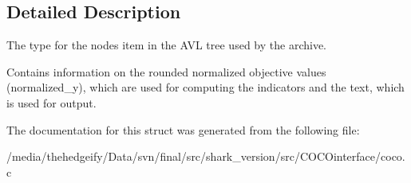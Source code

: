 \subsection{Detailed Description}
The type for the node\textquotesingle{}s item in the A\+VL tree used by the archive. 

Contains information on the rounded normalized objective values (normalized\+\_\+y), which are used for computing the indicators and the text, which is used for output. 

The documentation for this struct was generated from the following file\+:\begin{DoxyCompactItemize}
\item 
/media/thehedgeify/\+Data/svn/final/src/shark\+\_\+version/src/\+C\+O\+C\+Ointerface/coco.\+c\end{DoxyCompactItemize}
